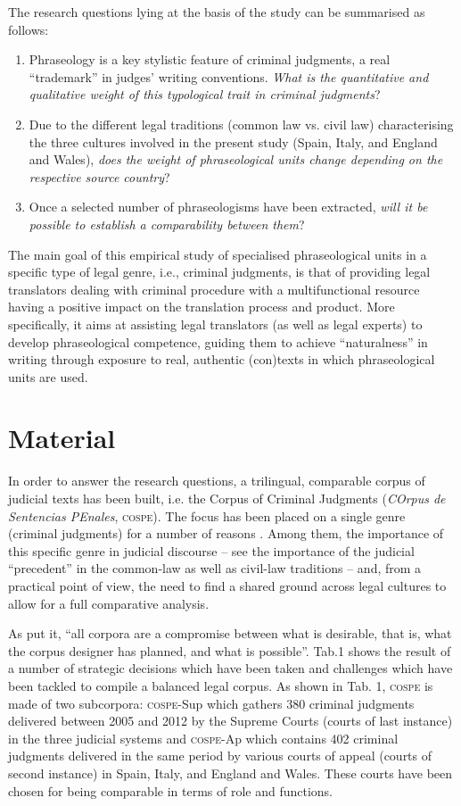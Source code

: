\documentclass[output=paper]{LSP/langsci}
\begin{document}
The research questions lying at the basis of the study can be summarised as follows:

\begin{enumerate}
\item Phraseology is a key stylistic feature of criminal judgments, a real “trademark” in judges’ writing conventions. \textit{What is the quantitative and qualitative weight of this typological trait in criminal judgments}? 
\item Due to the different legal traditions (common law vs. civil law) characterising the three cultures involved in the present study (Spain, Italy, and England and Wales), \textit{does the weight of phraseological units change depending on the respective source country}? 
\item Once a selected number of phraseologisms have been extracted, \textit{will it be possible to establish a comparability between them}?
\end{enumerate}

The main goal of this empirical study of specialised phraseological units in a specific type of legal genre, i.e., criminal judgments, is that of providing legal translators dealing with criminal procedure with a multifunctional resource having a positive impact on the translation process and product. More specifically, it aims at assisting legal translators (as well as legal experts) to develop phraseological competence, guiding them to achieve “naturalness” in writing through exposure to real, authentic (con)texts in which phraseological units are used.

\section{Material}
In order to answer the research questions, a trilingual, comparable corpus of judicial texts has been built, i.e. the Corpus of Criminal Judgments (\textit{COrpus de Sentencias PEnales}, \textsc{cospe}). The focus has been placed on a single genre (criminal judgments) for a number of reasons \citep[see][171--181]{Pontrandolfo2013a}. Among them, the importance of this specific genre in judicial discourse – see the importance of the judicial “precedent” in the common-law as well as civil-law traditions – and, from a practical point of view, the need to find a shared ground across legal cultures to allow for a full comparative analysis.

As \citet[156--157]{Hunston2008} put it, “all corpora are a compromise between what is desirable, that is, what the corpus designer has planned, and what is possible”. Tab.1 shows the result of a number of strategic decisions which have been taken and challenges which have been tackled to compile a balanced legal corpus. As shown in Tab. 1, \textsc{cospe} is made of two subcorpora: \textsc{cospe}-Sup which gathers 380 criminal judgments delivered between 2005 and 2012 by the Supreme Courts (courts of last instance) in the three judicial systems and \textsc{cospe}-Ap which contains 402 criminal judgments delivered in the same period by various courts of appeal (courts of second instance) in Spain, Italy, and England and Wales. These courts have been chosen for being comparable in terms of role and functions.
\end{document}
